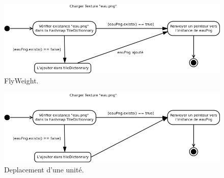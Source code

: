 \begin{figure}
    \begin{center}  
    \includegraphics[width=\textwidth]{flyWeight.png}
    \caption{FlyWeight.}
    \label{flyweight}
\end{center}
\end{figure}

\begin{figure}
    \begin{center}  
    \includegraphics[width=\textwidth]{dep.png}
    \caption{Deplacement d'une unité.}
    \label{dep}
\end{center}
\end{figure}

